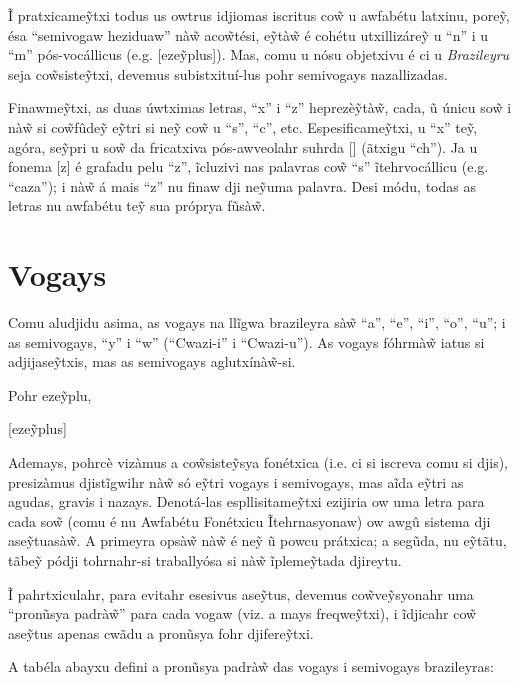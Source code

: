\documentclass[12pt, a5paper, titlepage]{article}
\begin{document}
\begin{bilingualpages}

    Ĩ pratxicame\~ytxi todus us owtrus idjiomas iscritus co\~w u awfabétu latxinu, pore\~y, ésa ``semivogaw heziduaw'' nà\~w aco\~wtési, e\~ytà\~w é cohétu utxillizáre\~y u ``n'' i u ``m'' pós-vocállicus (e.g. [eze\~yplus]). Mas, comu u nósu objetxivu é ci u \textit{Brazileyru} seja co\~wsiste\~ytxi, devemus subistxituí-lus pohr semivogays nazallizadas.

    Finawme\~ytxi, as duas úwtximas letras, ``x'' i ``z'' heprezè\~ytà\~w, cada, ũ
    únicu so\~w i nà\~w si co\~wfûde\~y e\~ytri si ne\~y co\~w u ``s'', ``c'', etc.
    Espesificame\~ytxi, u ``x'' te\~y, agóra, se\~ypri u so\~w da fricatxiva
    pós-awveolahr suhrda [\textesh] (ãtxigu ``ch''). Ja u fonema [z] é grafadu pelu
    ``z'', ĩcluzivi nas palavras co\~w ``s'' ĩtehrvocállicu (e.g. ``caza''); i
    nà\~w á mais ``z'' nu finaw dji ne\~yuma palavra. Desi módu, todas as letras nu
    awfabétu te\~y sua próprya fũsà\~w.

    \section{Vogays}
    Comu aludjidu asima, as vogays na llĩgwa brazileyra sà\~w ``a'', ``e'', ``i'',
    ``o'', ``u''; i as semivogays, ``y'' i ``w'' (``Cwazi-i'' i ``Cwazi-u''). As
    vogays fóhrmà\~w iatus si adjijase\~ytxis, mas as semivogays aglutxínà\~w-si.

    Pohr eze\~yplu,

    [eze\~yplus]

    Ademays, pohrcè vizàmus a co\~wsiste\~ysya fonétxica (i.e. ci si iscreva comu
    si djis), presizàmus djistĩgwihr nà\~w só e\~ytri vogays i semivogays, mas aĩda
    e\~ytri as agudas, gravis i nazays. Denotá-las espllisitame\~ytxi ezijiria ow
    uma letra para cada so\~w (comu é nu Awfabétu Fonétxicu Ĩtehrnasyonaw) ow awgû
    sistema dji ase\~ytuasà\~w. A primeyra opsà\~w nà\~w é ne\~y ũ powcu prátxica;
    a segũda, nu e\~ytãtu, tãbe\~y pódji tohrnahr-si traballyósa si nà\~w
    ĩpleme\~ytada djireytu.

    Ĩ pahrtxiculahr, para evitahr esesivus ase\~ytus, devemus co\~wve\~ysyonahr uma ``pronũsya padrà\~w'' para cada vogaw (viz. a mays freqwe\~ytxi), i ĩdjicahr co\~w ase\~ytus apenas cwãdu a pronũsya fohr djifere\~ytxi.

    A tabéla abayxu defini a pronũsya padrà\~w das vogays i semivogays brazileyras:

    \BrTableVowels


\end{bilingualpages}
\end{document}
